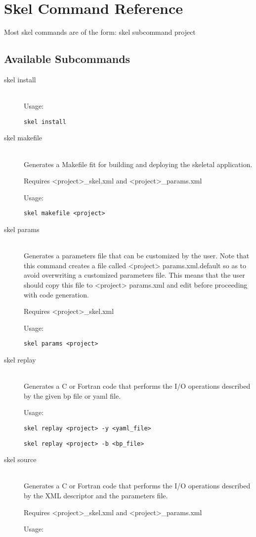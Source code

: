 \chapter{Skel Command Reference}

Most skel commands are of the form:
skel
subcommand project
\section{Available Subcommands}

\begin{description}
  \item[skel install] \hfill \\
Usage:

{\tt skel install}
  \item[skel makefile] \hfill \\
Generates a Makefile fit for building and deploying the skeletal
application.

Requires <project>\_skel.xml and <project>\_params.xml

Usage:

{\tt skel makefile <project>}
  \item[skel params] \hfill \\
Generates a parameters file that can be customized by the user.
Note that this command creates a file called <project> params.xml.default
so as to avoid overwriting a customized parameters file. This means that
the user should copy this file to <project> params.xml and edit before
proceeding with code generation.

Requires <project>\_skel.xml

Usage:

{\tt skel params <project>}
  \item[skel replay] \hfill \\
Generates a C or Fortran code that performs the I/O operations
described by the given bp file or yaml file.

Usage:

{\tt skel replay <project> -y <yaml\_file>}

{\tt skel replay <project> -b <bp\_file>}
  \item[skel source] \hfill \\
Generates a C or Fortran code that performs the I/O operations
described by the XML descriptor and the parameters file.

Requires <project>\_skel.xml and <project>\_params.xml

Usage:


\end{description}
